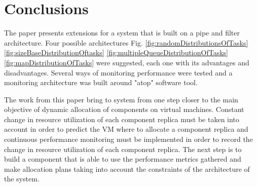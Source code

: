 \section*{Conclusions}
The paper presents extensions for a system that is built on a pipe and filter architecture. Four possible architectures Fig. \ref{fig:randomDistributionsOfTasks} \ref{fig:sizeBaseDistributionOftasks} \ref{fig:multipleQueueDistributionOfTasks} \ref{fig:mapDistributionOfTasks} were suggested, each one with its advantages and disadvantages. Several ways of monitoring performance were tested and a monitoring architecture was built around "atop" software tool. 

The work from this paper bring to system from \cite{IrimieAndPetcu} one step closer to the main objective of dynamic allocation of components on virtual machines. Constant change in resource utilization of each component replica must be taken into account in order to predict the VM where to allocate a component replica and continuous performance monitoring must be implemented in order to record the change in resource utilization of each component replica. The next step is to build a component that is able to use the performance metrics gathered and make allocation plans taking into account the constraints of the architecture of the system.